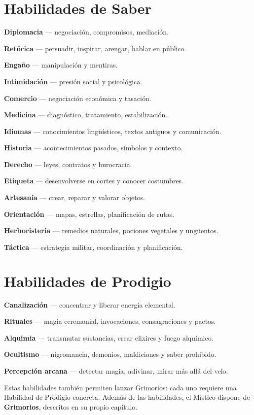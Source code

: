 \documentclass[10pt,a4paper]{article}
\begin{document}
\section*{Habilidades de Saber}
\textbf{Diplomacia} — negociación, compromisos, mediación.

\textbf{Retórica} — persuadir, inspirar, arengar, hablar en público.

\textbf{Engaño} — manipulación y mentiras.

\textbf{Intimidación} — presión social y psicológica.

\textbf{Comercio} — negociación económica y tasación.

\textbf{Medicina} — diagnóstico, tratamiento, estabilización.

\textbf{Idiomas} — conocimientos lingüísticos, textos antiguos y comunicación.

\textbf{Historia} — acontecimientos pasados, símbolos y contexto.

\textbf{Derecho} — leyes, contratos y burocracia.

\textbf{Etiqueta} — desenvolverse en cortes y conocer costumbres.

\textbf{Artesanía} — crear, reparar y valorar objetos.

\textbf{Orientación} — mapas, estrellas, planificación de rutas.

\textbf{Herboristería} — remedios naturales, pociones vegetales y ungüentos.

\textbf{Táctica} — estrategia militar, coordinación y planificación.

\section*{Habilidades de Prodigio}
\textbf{Canalización} — concentrar y liberar energía elemental.

\textbf{Rituales} — magia ceremonial, invocaciones, consagraciones y pactos.

\textbf{Alquimia} — transmutar sustancias, crear elixires y fuego alquímico.

\textbf{Ocultismo} — nigromancia, demonios, maldiciones y saber prohibido.

\textbf{Percepción arcana} — detectar magia, adivinar, mirar más allá del velo.

Estas habilidades también permiten lanzar Grimorios: cada uno requiere una Habilidad de Prodigio concreta. Además de las habilidades, el Místico dispone de \textbf{Grimorios}, descritos en su propio capítulo.
\end{document}
